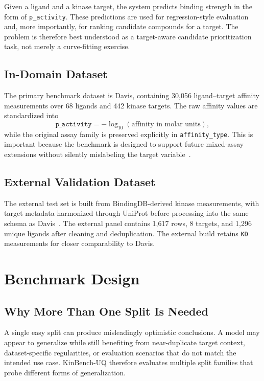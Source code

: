 \documentclass[11pt]{article}
\begin{document}
Given a ligand and a kinase target, the system predicts binding strength in the
form of \texttt{p\_activity}. These predictions are used for regression-style
evaluation and, more importantly, for ranking candidate compounds for a target.
The problem is therefore best understood as a target-aware candidate
prioritization task, not merely a curve-fitting exercise.

\subsection{In-Domain Dataset}

The primary benchmark dataset is Davis, containing 30,056 ligand--target
affinity measurements over 68 ligands and 442 kinase targets. The raw affinity
values are standardized into
\[
\texttt{p\_activity} = -\log_{10}(\text{affinity in molar units}),
\]
while the original assay family is preserved explicitly in
\texttt{affinity\_type}. This is important because the benchmark is designed to
support future mixed-assay extensions without silently mislabeling the target
variable~\cite{davis_dataset}.

\subsection{External Validation Dataset}

The external test set is built from BindingDB-derived kinase measurements,
with target metadata harmonized through UniProt before processing into the same
schema as Davis~\cite{bindingdb,uniprot}. The external panel contains
1,617 rows, 8 targets, and 1,296 unique ligands after cleaning and
deduplication. The external build retains \texttt{KD} measurements for
closer comparability to Davis.

\section{Benchmark Design}

\subsection{Why More Than One Split Is Needed}

A single easy split can produce misleadingly optimistic conclusions. A model
may appear to generalize while still benefiting from near-duplicate target
context, dataset-specific regularities, or evaluation scenarios that do not
match the intended use case. KinBench-UQ therefore evaluates multiple split
families that probe different forms of generalization.
\end{document}
